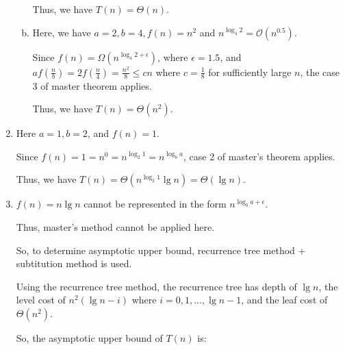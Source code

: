 \documentclass[12pt]{article}
\begin{document}
\begin{enumerate}[1.]
\begin{enumerate}[a)]
        \bigskip

        Thus, we have $T(n) = \Theta(n)$.

        \bigskip

        \item

        Here, we have $a = 2, b = 4, f(n) = n^2$ and $n^{\log_4 2} = \mathcal{O}(n^0.5)$.

        \bigskip

        Since $f(n) = \Omega(n^{\log_4 2 + \epsilon})$, where $\epsilon = 1.5$, and
        $af(\frac{n}{b}) = 2 f (\frac{n}{4}) = \frac{n^2}{8} \leq cn$ where $c = \frac{1}{8}$
        for sufficiently large $n$, the case 3 of master theorem applies.

        \bigskip

        Thus, we have $T(n) = \Theta(n^2)$.

    \end{enumerate}

    \bigskip

    \item

    Here $a = 1, b = 2$, and $f(n) = 1$.

    \bigskip

    Since $f(n) = 1 = n^0 = n^{\log_2 1} = n^{\log_b a}$, case 2 of master's theorem
    applies.

    \bigskip

    Thus, we have $T(n) = \Theta(n^{\log_2 1}\lg n) = \Theta(\lg n)$.

    \bigskip

    \item

    $f(n) = n \lg n$ cannot be represented in the form $n^{\log_b a + \epsilon}$.

    \bigskip

    Thus, master's method cannot be applied here.

    \bigskip

    So, to determine asymptotic upper bound, recurrence tree method + subtitution method is used.

    \bigskip

    Using the recurrence tree method, the recurrence tree has depth of  $\lg n$, the
    level cost of $n^2 (\lg n - i)$ where $i = 0, 1, ..., \lg n - 1$, and the leaf cost of
    $\Theta(n^2)$.

    \bigskip

    So, the asymptotic upper bound of $T(n)$ is:


\end{enumerate}
\end{document}
